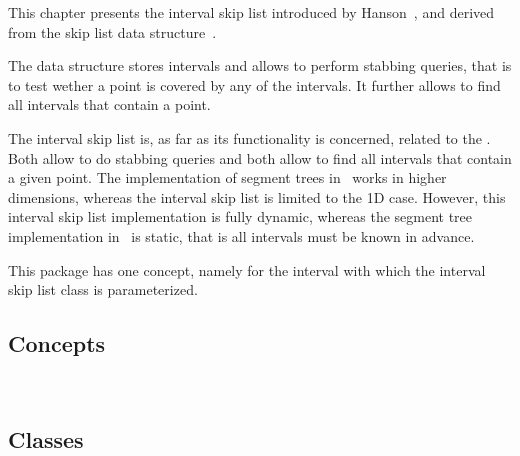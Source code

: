 
This chapter presents the interval skip list introduced by Hanson~\cite{h-islds-91},
and derived from the skip list data structure~\cite{p-slpab-90}.

The data structure stores intervals and allows to perform stabbing queries,
that is to test wether a point is covered by any of the intervals.
It further allows to find all intervals that contain a point.

The interval skip list is, as far as its functionality is concerned,
related to the . Both allow to do stabbing queries
and both allow to find all intervals that contain a given point.  The
implementation of segment trees in \cgal\ works in higher
dimensions, whereas the interval skip list is limited to the 1D
case. However, this interval skip list implementation is fully
dynamic, whereas the segment tree implementation in \cgal\ is
static, that is all intervals must be known in advance.

This package has one concept, namely for the interval with which 
the interval skip list class is parameterized.

\subsection*{Concepts}

\\


\subsection*{Classes}

\\
\\
\\

